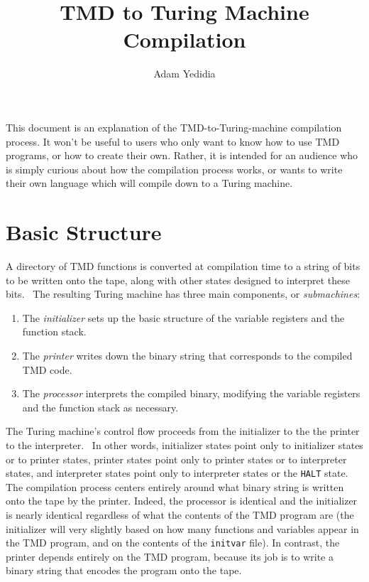 \documentclass[11pt]{article}
\title{TMD to Turing Machine Compilation}
\author{Adam Yedidia}
\begin{document}
    
\maketitle

This document is an explanation of the TMD-to-Turing-machine compilation process. It won't be useful to users who only want to know how to use TMD programs, or how to create their own. Rather, it is intended for an audience who is simply curious about how the compilation process works, or wants to write their own language which will compile down to a Turing machine. \\

\section{Basic Structure}

A directory of TMD functions is converted at compilation time to a string of bits to be written onto the tape, along with other states designed to interpret these bits. \ The resulting Turing machine has three main components, or \emph{submachines}: \\

\begin{enumerate}
\item The \emph{initializer} sets up the basic structure of the variable registers and the function stack.
\item The \emph{printer} writes down the binary string that corresponds to the compiled TMD code.
\item The \emph{processor} interprets the compiled binary, modifying the variable registers and the function stack as necessary.
\end{enumerate}

The Turing machine's control flow proceeds from the initializer to the the printer to the interpreter. \ In other words, initializer states point only to initializer states or to printer states, printer states point only to printer states or to interpreter states, and interpreter states point only to interpreter states or the \texttt{HALT} state. \\

The compilation process centers entirely around what binary string is written onto the tape by the printer. Indeed, the processor is identical and the initializer is nearly identical regardless of what the contents of the TMD program are (the initializer will very slightly based on how many functions and variables appear in the TMD program, and on the contents of the \texttt{initvar} file). In contrast, the printer depends entirely on the TMD program, because its job is to write a binary string that encodes the program onto the tape. \\
\end{document}

